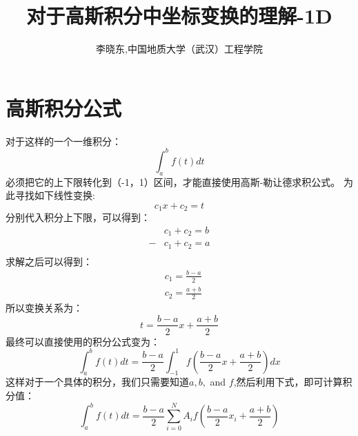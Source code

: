\documentclass{article}                          %
\title{对于高斯积分中坐标变换的理解-1D}
\author{李晓东,中国地质大学（武汉）工程学院}
\numberwithin{equation}{subsection}              %
\begin{document}
\maketitle
\section{ 高斯积分公式}
对于这样的一个一维积分：
\begin{equation}\label{key}
\int_{a}^{b} f(t) dt
\end{equation}
必须把它的上下限转化到（-1，1）区间，才能直接使用高斯-勒让德求积公式。
为此寻找如下线性变换:
\begin{equation}\label{key}
c_1 x+c_2=t
\end{equation}
分别代入积分上下限，可以得到：
\begin{equation}\label{key}
\begin{aligned}
&c_1+c_2=b\\
-&c_1+c_2=a\\
\end{aligned}
\end{equation}
求解之后可以得到：
\begin{equation}\label{key}
\begin{aligned}
&c_1=\frac{b-a}{2}\\
&c_2=\frac{a+b}{2}
\end{aligned}
\end{equation}
所以变换关系为：
\begin{equation}\label{key}
t=\frac{b-a}{2} x+ \frac{a+b}{2}
\end{equation}
最终可以直接使用的积分公式变为：
\begin{equation}\label{key}
\int_{a}^{b} f(t) dt= \frac{b-a}{2} \int_{-1}^{1} f\left(\frac{b-a}{2} x+ \frac{a+b}{2} \right) dx
\end{equation}
这样对于一个具体的积分，我们只需要知道$ a,b,$ and $f $,然后利用下式，即可计算积分值：
\begin{equation}\label{key}
\int_{a}^{b} f(t) dt= \frac{b-a}{2} \sum_{i=0}^{N} A_i f\left(\frac{b-a}{2} x_i+ \frac{a+b}{2} \right)
\end{equation}
\end{document}

